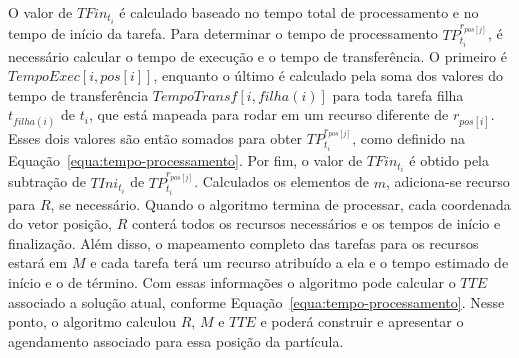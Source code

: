 \documentclass[sigconf]{acmart}
\begin{document}
O valor de $TFin_{t_i}$ é calculado baseado no tempo total de processamento e no tempo de início da tarefa. Para determinar o tempo de processamento $TP_{{t_i}}^{r_{pos[j]}}$, é necessário calcular o tempo de execução e o tempo de transferência. O primeiro é $TempoExec[i,pos[i]]$, enquanto o último é calculado pela soma dos valores do tempo de transferência $TempoTransf[i,filha(i)]$ para toda tarefa filha $t_{filha(i)}$ de ${t_i}$, que está mapeada para rodar em um recurso diferente de $r_{pos[i]}$. Esses dois valores são então somados para obter $TP_{{t_i}}^{r_{pos[j]}}$, como definido na Equação~\ref{equa:tempo-processamento}. Por fim, o valor de $TFin_{t_i}$ é obtido pela subtração de $TIni_{t_i}$ de $TP_{{t_i}}^{r_{pos[j]}}$.
Calculados os elementos de $ m $, adiciona-se recurso para $R$, se necessário. 
Quando o algoritmo termina de processar, cada coordenada do vetor posição, $R$ conterá todos os recursos necessários e os tempos de início e finalização. Além disso, o mapeamento completo das tarefas para os recursos estará em $M$ e cada tarefa terá um recurso atribuído a ela e o tempo estimado de início e o de término. Com essas informações o algoritmo pode calcular o $TTE$  associado a solução atual, conforme Equação~\ref{equa:tempo-processamento}. Nesse ponto, o algoritmo calculou $R$, $M$ e $TTE$ e poderá construir e apresentar o agendamento associado para essa posição da partícula.
\end{document}
